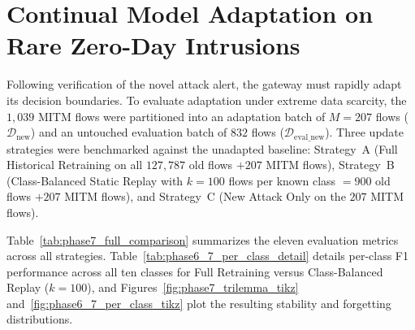 \section{Continual Model Adaptation on Rare Zero-Day Intrusions}
\label{sec:phase6_7_results}

Following verification of the novel attack alert, the gateway must rapidly adapt its decision boundaries. To evaluate adaptation under extreme data scarcity, the $1{,}039$ MITM flows were partitioned into an adaptation batch of $M = 207$ flows ($\mathcal{D}_{\text{new}}$) and an untouched evaluation batch of $832$ flows ($\mathcal{D}_{\text{eval\_new}}$). Three update strategies were benchmarked against the unadapted baseline: Strategy~A (Full Historical Retraining on all $127{,}787$ old flows $+ 207$ MITM flows), Strategy~B (Class-Balanced Static Replay with $k = 100$ flows per known class $= 900$ old flows $+ 207$ MITM flows), and Strategy~C (New Attack Only on the $207$ MITM flows).

Table~\ref{tab:phase7_full_comparison} summarizes the eleven evaluation metrics across all strategies. Table~\ref{tab:phase6_7_per_class_detail} details per-class F1 performance across all ten classes for Full Retraining versus Class-Balanced Replay ($k=100$), and Figures~\ref{fig:phase7_trilemma_tikz} and~\ref{fig:phase6_7_per_class_tikz} plot the resulting stability and forgetting distributions.

